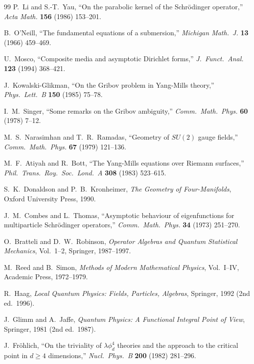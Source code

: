 \begin{thebibliography}{99}
P.~Li and S.-T.~Yau, ``On the parabolic kernel of the Schr\"odinger operator,'' 
\textit{Acta Math.} \textbf{156} (1986) 153--201.

B.~O'Neill, ``The fundamental equations of a submersion,'' 
\textit{Michigan Math.\ J.} \textbf{13} (1966) 459--469.

U.~Mosco, ``Composite media and asymptotic Dirichlet forms,'' 
\textit{J.\ Funct.\ Anal.} \textbf{123} (1994) 368--421.

J.~Kowalski-Glikman, ``On the Gribov problem in Yang-Mills theory,'' 
\textit{Phys.\ Lett.\ B} \textbf{150} (1985) 75--78.

I.~M.~Singer, ``Some remarks on the Gribov ambiguity,'' 
\textit{Comm.\ Math.\ Phys.} \textbf{60} (1978) 7--12.

M.~S.~Narasimhan and T.~R.~Ramadas, ``Geometry of $SU(2)$ gauge fields,'' 
\textit{Comm.\ Math.\ Phys.} \textbf{67} (1979) 121--136.

M.~F.~Atiyah and R.~Bott, ``The Yang-Mills equations over Riemann surfaces,'' 
\textit{Phil.\ Trans.\ Roy.\ Soc.\ Lond.\ A} \textbf{308} (1983) 523--615.

S.~K.~Donaldson and P.~B.~Kronheimer, \textit{The Geometry of Four-Manifolds}, 
Oxford University Press, 1990.

J.~M.~Combes and L.~Thomas, ``Asymptotic behaviour of eigenfunctions for multiparticle 
Schr\"odinger operators,'' \textit{Comm.\ Math.\ Phys.} \textbf{34} (1973) 251--270.

O.~Bratteli and D.~W.~Robinson, \textit{Operator Algebras and Quantum Statistical 
Mechanics}, Vol.~1--2, Springer, 1987--1997.

M.~Reed and B.~Simon, \textit{Methods of Modern Mathematical Physics}, 
Vol.~I--IV, Academic Press, 1972--1979.

R.~Haag, \textit{Local Quantum Physics: Fields, Particles, Algebras}, 
Springer, 1992 (2nd ed.\ 1996).

J.~Glimm and A.~Jaffe, \textit{Quantum Physics: A Functional Integral Point of View}, 
Springer, 1981 (2nd ed.\ 1987).

J.~Fr\"ohlich, ``On the triviality of $\lambda\phi^4_d$ theories and the approach 
to the critical point in $d \geq 4$ dimensions,'' 
\textit{Nucl.\ Phys.\ B} \textbf{200} (1982) 281--296.


\end{thebibliography}

